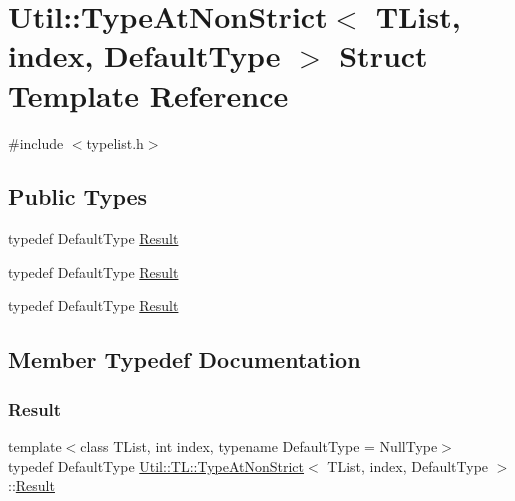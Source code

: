 \hypertarget{structUtil_1_1TL_1_1TypeAtNonStrict}{}\section{Util\+:\+:Type\+At\+Non\+Strict$<$ T\+List, index, Default\+Type $>$ Struct Template Reference}
\label{structUtil_1_1TL_1_1TypeAtNonStrict}


{\ttfamily \#include $<$typelist.\+h$>$}

\subsection*{Public Types}
\begin{DoxyCompactItemize}
\item 
typedef Default\+Type \mbox{\hyperlink{structUtil_1_1TL_1_1TypeAtNonStrict_a39b06fe5e93590ee7a8870acb2017521}{Result}}
\item 
typedef Default\+Type \mbox{\hyperlink{structUtil_1_1TL_1_1TypeAtNonStrict_a39b06fe5e93590ee7a8870acb2017521}{Result}}
\item 
typedef Default\+Type \mbox{\hyperlink{structUtil_1_1TL_1_1TypeAtNonStrict_a39b06fe5e93590ee7a8870acb2017521}{Result}}
\end{DoxyCompactItemize}


\subsection{Member Typedef Documentation}
\mbox{\label{structUtil_1_1TL_1_1TypeAtNonStrict_a39b06fe5e93590ee7a8870acb2017521}} 
\subsubsection{\texorpdfstring{Result}{Result}\hspace{0.1cm}{\footnotesize\ttfamily [1/3]}}
{\footnotesize\ttfamily template$<$class T\+List, int index, typename Default\+Type = Null\+Type$>$ \\
typedef Default\+Type \mbox{\hyperlink{structUtil_1_1TL_1_1TypeAtNonStrict}{Util\+::\+T\+L\+::\+Type\+At\+Non\+Strict}}$<$ T\+List, index, Default\+Type $>$\+::\mbox{\hyperlink{structUtil_1_1TL_1_1TypeAtNonStrict_a39b06fe5e93590ee7a8870acb2017521}{Result}}}

